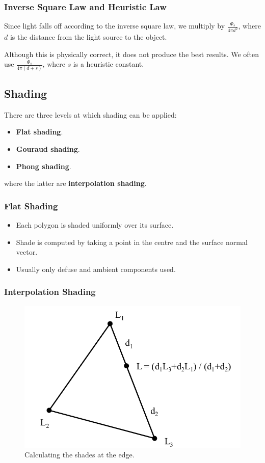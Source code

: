 \documentclass[11pt]{article}
\begin{document}
\subsubsection{Inverse Square Law and Heuristic Law}
Since light falls off according to the inverse square law, we multiply by $\frac{\Phi_s}{4\pi d^2}$, where $d$ is the distance from the light source to the object.

Although this is physically correct, it does not produce the best results.
We often use $\frac{\Phi_s}{4\pi(d + s)}$, where $s$ is a heuristic constant.

\subsection{Shading}
There are three levels at which shading can be applied:
\begin{itemize}
  \item \textbf{Flat shading}.
  \item \textbf{Gouraud shading}.
  \item \textbf{Phong shading}.
\end{itemize}
where the latter are \textbf{interpolation shading}.

\subsubsection{Flat Shading}

\begin{itemize}
  \item Each polygon is shaded uniformly over its surface.
  \item Shade is computed by taking a point in the centre and the surface normal vector.
  \item Usually only defuse and ambient components used.
\end{itemize}

\subsubsection{Interpolation Shading}
\begin{figure}[htb!]
  \centering
  \caption{Calculating the shades at the edge.}
  \includegraphics[scale=0.3]{interpolationedge}
\end{figure}
\end{document}
